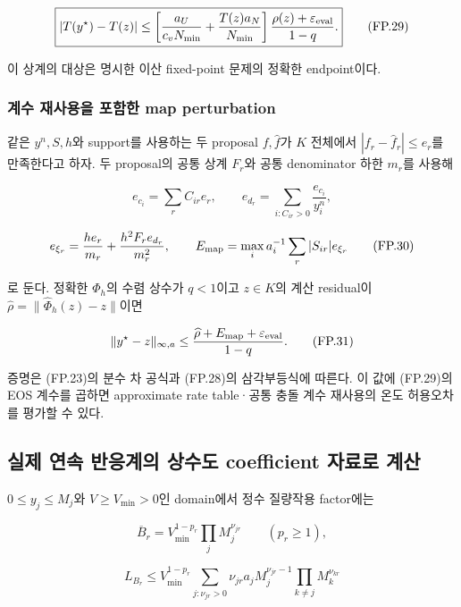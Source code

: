 \[
\boxed{
|T(y^\star)-T(z)|
\le
\left[
\frac{a_U}{c_vN_{\min}}
+\frac{T(z)a_N}{N_{\min}}
\right]
\frac{\rho(z)+\varepsilon_{\rm eval}}{1-q}.
}
\tag{FP.29}
\]

이 상계의 대상은 명시한 이산 fixed-point 문제의 정확한 endpoint이다.

\hypertarget{uxacc4uxc218-uxc7acuxc0acuxc6a9uxc744-uxd3ecuxd568uxd55c-map-perturbation}{%
\subsubsection{계수 재사용을 포함한 map perturbation}\label{uxacc4uxc218-uxc7acuxc0acuxc6a9uxc744-uxd3ecuxd568uxd55c-map-perturbation}}

같은 \(y^n,S,h\)와 support를 사용하는 두 proposal \(f,\widehat f\)가 \(K\) 전체에서 \(|f_r-\widehat f_r|\le e_r\)를 만족한다고 하자. 두 proposal의 공통 상계 \(F_r\)와 공통 denominator 하한 \(m_r\)를 사용해

\[
e_{c_i}=\sum_rC_{ir}e_r,\qquad
e_{d_r}=\sum_{i:C_{ir}>0}\frac{e_{c_i}}{y_i^n},
\]

\[
e_{\xi_r}=\frac{h e_r}{m_r}
+\frac{h^2F_re_{d_r}}{m_r^2},\qquad
E_{\rm map}=\max_i a_i^{-1}\sum_r|S_{ir}|e_{\xi_r}
\tag{FP.30}
\]

로 둔다. 정확한 \(\Phi_h\)의 수렴 상수가 \(q<1\)이고 \(z\in K\)의 계산 residual이 \(\widehat\rho=\|\widehat\Phi_h(z)-z\|\)이면

\[
\|y^\star-z\|_{\infty,a}
\le\frac{\widehat\rho+E_{\rm map}+\varepsilon_{\rm eval}}{1-q}.
\tag{FP.31}
\]

증명은 (FP.23)의 분수 차 공식과 (FP.28)의 삼각부등식에 따른다. 이 값에 (FP.29)의 EOS 계수를 곱하면 approximate rate table·공통 충돌 계수 재사용의 온도 허용오차를 평가할 수 있다.

\hypertarget{uxc2e4uxc81c-uxc5f0uxc18d-uxbc18uxc751uxacc4uxc758-uxc0c1uxc218uxb3c4-coefficient-uxc790uxb8ccuxb85c-uxacc4uxc0b0}{%
\subsection{실제 연속 반응계의 상수도 coefficient 자료로 계산}\label{uxc2e4uxc81c-uxc5f0uxc18d-uxbc18uxc751uxacc4uxc758-uxc0c1uxc218uxb3c4-coefficient-uxc790uxb8ccuxb85c-uxacc4uxc0b0}}

\(0\le y_j\le M_j\)와 \(V\ge V_{\min}>0\)인 domain에서 정수 질량작용 factor에는

\[
\overline B_r
=
V_{\min}^{1-p_r}\prod_j M_j^{\nu_{jr}}
\qquad (p_r\ge1),
\]

\[
L_{B_r}
\le
V_{\min}^{1-p_r}
\sum_{j:\nu_{jr}>0}
\nu_{jr}a_j M_j^{\nu_{jr}-1}
\prod_{k\ne j}M_k^{\nu_{kr}}
\tag{FP.32}
\]

